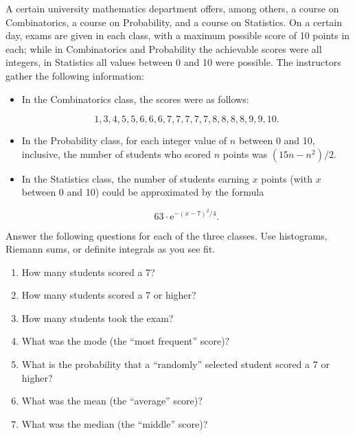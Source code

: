 \documentclass[12pt]{article}
\begin{document}
\vspace*{.2in}


\noindent  A certain university mathematics department offers, among others, a course on Combinatorics, a course on Probability, and a course on Statistics.  On a certain day, exams are given in each class, with a maximum possible score of 10 points in each; while in Combinatorics and Probability the achievable scores were all integers, in Statistics all values between 0 and 10 were possible.  The instructors gather the following information:

\begin{itemize}
  \item In the Combinatorics class, the scores were as follows:
  
$$1, 3, 4, 5, 5, 6, 6, 6, 7, 7, 7, 7, 7, 8, 8, 8, 8, 9, 9, 10.$$

\item In the Probability class, for each integer value of $n$ between 0 and 10, inclusive, the number of students who scored $n$ points was $(15n-n^2)/2$.

\item In the Statistics class, the number of students earning $x$ points (with $x$ between 0 and 10) could be approximated by the formula

$$63 \cdot \mathrm{e}^{-(x-7)^2/4}.$$

\end{itemize}

Answer the following questions for each of the three classes.  Use histograms, Riemann sums, or definite integrals as you see fit.


\begin{enumerate}

\item  How many students scored a 7?

\item  How many students scored a 7 or higher?

\item  How many students took the exam?

\item  What was the mode (the ``most frequent'' score)?

\item  What is the probability that a ``randomly'' selected student scored a 7 or higher?

\item  What was the mean (the ``average'' score)?

\item  What was the median (the ``middle'' score)?


\end{enumerate}
\end{document}
